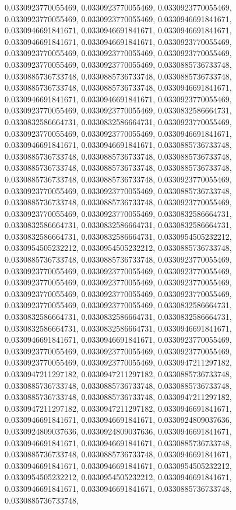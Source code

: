\documentclass[
  ,man]{apa6}
\begin{document}
0.0330923770055469, 0.0330923770055469, 0.0330923770055469, 0.0330923770055469, 0.0330923770055469, 0.0330946691841671, 0.0330946691841671, 0.0330946691841671, 0.0330946691841671, 0.0330946691841671, 0.0330946691841671, 0.0330923770055469, 0.0330923770055469, 0.0330923770055469, 0.0330923770055469, 0.0330923770055469, 0.0330923770055469, 0.0330885736733748, 0.0330885736733748, 0.0330885736733748, 0.0330885736733748, 0.0330885736733748, 0.0330885736733748, 0.0330946691841671, 0.0330946691841671, 0.0330946691841671,
0.0330923770055469, 0.0330923770055469, 0.0330923770055469, 0.0330832586664731, 0.0330832586664731, 0.0330832586664731, 0.0330923770055469, 0.0330923770055469, 0.0330923770055469, 0.0330946691841671, 0.0330946691841671, 0.0330946691841671, 0.0330885736733748, 0.0330885736733748, 0.0330885736733748, 0.0330885736733748, 0.0330885736733748, 0.0330885736733748, 0.0330885736733748, 0.0330885736733748, 0.0330885736733748, 0.0330923770055469, 0.0330923770055469, 0.0330923770055469, 0.0330885736733748, 0.0330885736733748,
0.0330885736733748, 0.0330923770055469, 0.0330923770055469, 0.0330923770055469, 0.0330832586664731, 0.0330832586664731, 0.0330832586664731, 0.0330832586664731, 0.0330832586664731, 0.0330832586664731, 0.0330954505232212, 0.0330954505232212, 0.0330954505232212, 0.0330885736733748, 0.0330885736733748, 0.0330885736733748, 0.0330923770055469, 0.0330923770055469, 0.0330923770055469, 0.0330923770055469, 0.0330923770055469, 0.0330923770055469, 0.0330923770055469, 0.0330923770055469, 0.0330923770055469, 0.0330923770055469,
0.0330923770055469, 0.0330923770055469, 0.0330832586664731, 0.0330832586664731, 0.0330832586664731, 0.0330832586664731, 0.0330832586664731, 0.0330832586664731, 0.0330946691841671, 0.0330946691841671, 0.0330946691841671, 0.0330923770055469, 0.0330923770055469, 0.0330923770055469, 0.0330923770055469, 0.0330923770055469, 0.0330923770055469, 0.0330947211297182, 0.0330947211297182, 0.0330947211297182, 0.0330885736733748, 0.0330885736733748, 0.0330885736733748, 0.0330885736733748, 0.0330885736733748, 0.0330885736733748,
0.0330947211297182, 0.0330947211297182, 0.0330947211297182, 0.0330946691841671, 0.0330946691841671, 0.0330946691841671, 0.0330924809037636, 0.0330924809037636, 0.0330924809037636, 0.0330946691841671, 0.0330946691841671, 0.0330946691841671, 0.0330885736733748, 0.0330885736733748, 0.0330885736733748, 0.0330946691841671, 0.0330946691841671, 0.0330946691841671, 0.0330954505232212, 0.0330954505232212, 0.0330954505232212, 0.0330946691841671, 0.0330946691841671, 0.0330946691841671, 0.0330885736733748, 0.0330885736733748,
\end{document}
